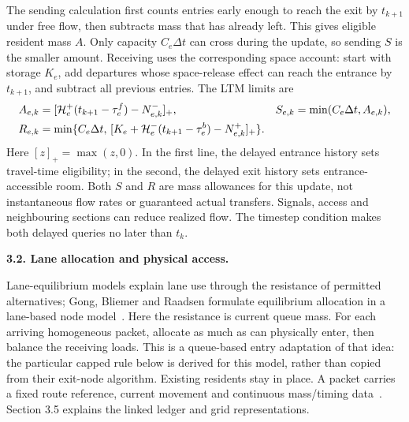 \documentclass[10pt,a4paper]{article}
\newcommand{\pos}[1]{[#1]_+}
\begin{document}
The sending calculation first counts entries early enough to reach the
exit by $t_{k+1}$ under free flow, then subtracts mass that has already
left. This gives eligible resident mass $A$. Only capacity $C_e\Delta t$
can cross during the update, so sending $S$ is the smaller amount.
Receiving uses the corresponding space account: start with storage
$K_e$, add departures whose space-release effect can reach the entrance
by $t_{k+1}$, and subtract all previous entries. The LTM limits are~\cite{m0}
\begin{align}
 A_{e,k}&=\pos{{\cal H}^+_e(t_{k+1}-\tau^f_e)-N^-_{e,k}},
 &S_{e,k}&=\min(C_e\Delta t,A_{e,k}),\label{eq:compact-sending}\\
 R_{e,k}&=\min\{C_e\Delta t,\,
 \pos{K_e+{\cal H}^-_e(t_{k+1}-\tau^b_e)-N^+_{e,k}}\}.
 \label{eq:compact-receiving}
\end{align}
Here $[z]_+=\max(z,0)$. In the first line, the delayed entrance history
sets travel-time eligibility; in the second, the delayed exit history
sets entrance-accessible room. Both $S$ and $R$ are mass allowances for
this update, not instantaneous flow rates or guaranteed actual transfers.
Signals, access and neighbouring sections can reduce realized flow.
The timestep condition makes both delayed queries no later than $t_k$.

\textbf{3.2. Lane allocation and physical access.}

Lane-equilibrium models explain lane use through the resistance of
permitted alternatives; Gong, Bliemer and Raadsen formulate equilibrium
allocation in a lane-based node model~\cite{gong}. Here the resistance is
current queue mass. For each arriving homogeneous packet, allocate as much
as can physically enter, then balance the receiving loads. This is a
queue-based entry adaptation of that idea: the particular capped rule
below is derived for this model, rather than copied from their exit-node
algorithm. Existing residents stay in place. A packet carries a fixed
route reference, current movement and continuous mass/timing data~\cite{m1}.
Section 3.5 explains the linked ledger and grid representations.
\par
\end{document}
